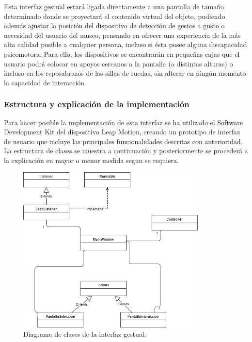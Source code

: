 Esta interfaz gestual estará ligada directamente a una pantalla de tamaño determinado donde se proyectará el contenido virtual del objeto, pudiendo además ajustar la posición del dispositivo de detección de gestos a gusto o necesidad del usuario del museo, pensando en ofrecer una experiencia de la más alta calidad posible a cualquier persona, incluso si ésta posee alguna discapacidad psicomotora. Para ello, los dispositivos se encontrarán en pequeñas cajas que el usuario podrá colocar en apoyos cercanos a la pantalla (a distintas alturas) o incluso en los reposabrazos de las sillas de ruedas, sin alterar en ningún momento la capacidad de interacción.

\subsubsection{Estructura y explicación de la implementación}

Para hacer posible la implementación de esta interfaz se ha utilizado el Software Development Kit del dispositivo Leap Motion, creando un prototipo de interfaz de usuario que incluye las principales funcionalidades descritas con anterioridad. La estructura de clases se muestra a continuación y posteriormente se procederá a la explicación en mayor o menor medida segun se requiera.

\begin{figure}[H]
	\centering
	\includegraphics[width=0.85\textwidth]{imagenes/InterfazGestual}
	\caption{Diagrama de clases de la interfaz gestual.}
\end{figure}

